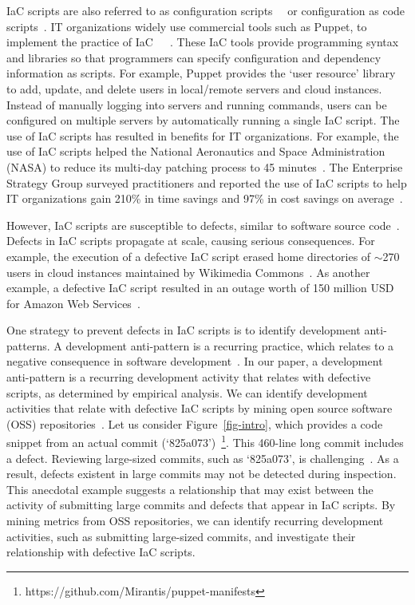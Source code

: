 \documentclass[smallextended]{svjour3}       %
\begin{document}
IaC scripts are also referred to as configuration scripts~\citep{SharmaPuppet2016}~\citep{Humble:2010:CD} or configuration as code scripts~\citep{Rahman:RCOSE18}. IT organizations widely use commercial tools such as Puppet, to implement the practice of IaC~\citep{Humble:2010:CD}~\citep{JiangAdamsMSR2015}~\citep{ShambaughRehearsal2016}. These IaC tools provide programming syntax and libraries so that programmers can specify configuration and dependency information as scripts. For example, Puppet provides the `user resource' library~\citep{puppet-doc} to add, update, and delete users in local/remote servers and cloud instances. Instead of manually logging into servers and running commands, users can be configured on multiple servers by automatically running a single IaC script. The use of IaC scripts has resulted in benefits for IT organizations. For example, the use of IaC scripts helped the National Aeronautics and Space Administration (NASA) to reduce its multi-day patching process to 45 minutes~\citep{nasa:iac}. The Enterprise Strategy Group surveyed practitioners and reported the use of IaC scripts to help IT organizations gain 210\% in time savings and 97\% in cost savings on average~\citep{ESG:iac}. 




However, IaC scripts are susceptible to defects, similar to software source code~\citep{JiangAdamsMSR2015}. Defects in IaC scripts propagate at scale, causing serious consequences. For example, the execution of a defective IaC script erased home directories of $\mathtt{\sim}$270 users in cloud instances maintained by Wikimedia Commons~\citep{wiki:horror}. As another example, a defective IaC script resulted in an outage worth of 150 million USD for Amazon Web Services~\citep{aws:horror}. 

One strategy to prevent defects in IaC scripts is to identify development anti-patterns. A development anti-pattern is a recurring practice, which relates to a negative consequence in software development~\citep{ap:brown}. In our paper, a development anti-pattern is a recurring development activity that relates with defective scripts, as determined by empirical analysis. We can identify development activities that relate with defective IaC scripts by mining open source software (OSS) repositories~\citep{adams:release:nutshell}. Let us consider Figure~\ref{fig-intro}, which provides a code snippet from an actual commit (`825a073')~\footnote{https://github.com/Mirantis/puppet-manifests}. This 460-line long commit includes a defect. Reviewing large-sized commits, such as `825a073', is challenging~\citep{storey:codereview:2018}. As a result, defects existent in large commits may not be detected during inspection. This anecdotal example suggests a relationship that may exist between the activity of submitting large commits and defects that appear in IaC scripts. By mining metrics from OSS repositories, we can identify recurring development activities, such as submitting large-sized commits, and investigate their relationship with defective IaC scripts. 
\end{document}
